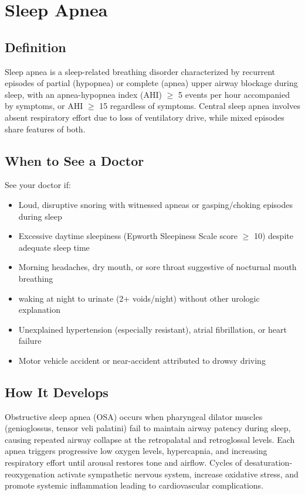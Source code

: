 \chapter{Sleep Apnea}

\section*{Definition}
Sleep apnea is a sleep-related breathing disorder characterized by recurrent episodes of partial (hypopnea) or complete (apnea) upper airway blockage during sleep, with an apnea-hypopnea index (AHI) $\ge$ 5 events per hour accompanied by symptoms, or AHI $\ge$ 15 regardless of symptoms. Central sleep apnea involves absent respiratory effort due to loss of ventilatory drive, while mixed episodes share features of both.

\section*{When to See a Doctor}
See your doctor if:
\begin{itemize}
  \item Loud, disruptive snoring with witnessed apneas or gasping/choking episodes during sleep
  \item Excessive daytime sleepiness (Epworth Sleepiness Scale score $\ge$ 10) despite adequate sleep time
  \item Morning headaches, dry mouth, or sore throat suggestive of nocturnal mouth breathing
  \item waking at night to urinate (2+ voids/night) without other urologic explanation
  \item Unexplained hypertension (especially resistant), atrial fibrillation, or heart failure
  \item Motor vehicle accident or near-accident attributed to drowsy driving
\end{itemize}

\section*{How It Develops}
Obstructive sleep apnea (OSA) occurs when pharyngeal dilator muscles (genioglossus, tensor veli palatini) fail to maintain airway patency during sleep, causing repeated airway collapse at the retropalatal and retroglossal levels. Each apnea triggers progressive low oxygen levels, hypercapnia, and increasing respiratory effort until arousal restores tone and airflow. Cycles of desaturation-reoxygenation activate sympathetic nervous system, increase oxidative stress, and promote systemic inflammation leading to cardiovascular complications.

